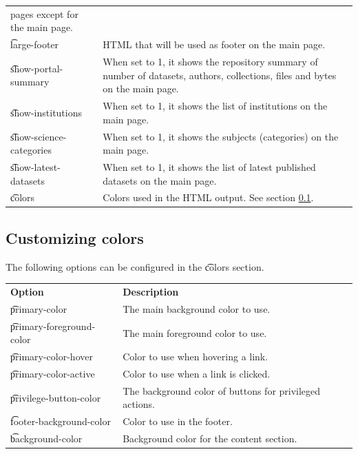 \begin{tabularx}{\textwidth}{*{1}{!{\VRule[-1pt]}l}!{\VRule[-1pt]}X}
                                pages except for the main page.\\
  \t{large-footer}            & HTML that will be used as footer on the
                                main page.\\
  \t{show-portal-summary}     & When set to 1, it shows the repository summary
                                of number of datasets, authors, collections,
                                files and bytes on the main page.\\
  \t{show-institutions}       & When set to 1, it shows the list of
                                institutions on the main page.\\
  \t{show-science-categories} & When set to 1, it shows the subjects
                                (categories) on the main page.\\
  \t{show-latest-datasets}    & When set to 1, it shows the list of latest
                                published datasets on the main page.\\
  \t{colors}                  & Colors used in the HTML output. See section
                                \ref{sec:customize-colors}.
\end{tabularx}

\subsection{Customizing colors}
\label{sec:customize-colors}

  The following options can be configured in the \t{colors} section.

\begin{tabularx}{\textwidth}{*{1}{!{\VRule[-1pt]}l}!{\VRule[-1pt]}X}
  \headrow
  \textbf{Option}              & \textbf{Description}\\
  \t{primary-color}            & The main background color to use.\\
  \t{primary-foreground-color} & The main foreground color to use.\\
  \t{primary-color-hover}      & Color to use when hovering a link.\\
  \t{primary-color-active}     & Color to use when a link is clicked.\\
  \t{privilege-button-color}   & The background color of buttons for
                                 privileged actions.\\
  \t{footer-background-color}  & Color to use in the footer.\\
  \t{background-color}         & Background color for the content section.
\end{tabularx}

